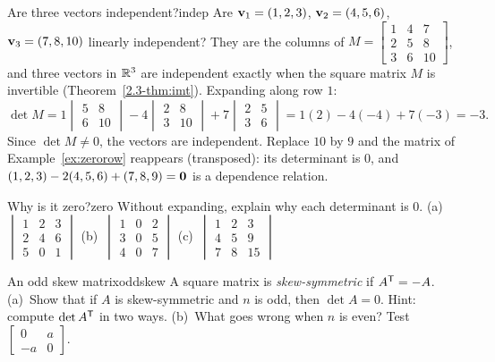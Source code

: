 \documentclass[11pt]{article}
\begin{document}
\begin{exmp}{Are three vectors independent?}{indep}
Are $\mathbf{v}_1=(1,2,3)$, $\mathbf{v}_2=(4,5,6)$, $\mathbf{v}_3=(7,8,10)$ linearly independent? They are the columns of $M=\begin{bmatrix}1&4&7\\2&5&8\\3&6&10\end{bmatrix}$, and three vectors in $\mathbb{R}^3$ are independent exactly when the square matrix $M$ is invertible (Theorem~\ref{2.3-thm:imt}). Expanding along row $1$:
\[
\det M=1\begin{vmatrix}5&8\\6&10\end{vmatrix}-4\begin{vmatrix}2&8\\3&10\end{vmatrix}+7\begin{vmatrix}2&5\\3&6\end{vmatrix}=1(2)-4(-4)+7(-3)=-3.
\]
Since $\det M\neq0$, the vectors are independent. Replace $10$ by $9$ and the matrix of Example~\ref{ex:zerorow} reappears (transposed): its determinant is $0$, and $(1,2,3)-2(4,5,6)+(7,8,9)=\mathbf{0}$ is a dependence relation.
\end{exmp}

\begin{kc}{Why is it zero?}{zero}
Without expanding, explain why each determinant is $0$.
(a)~$\begin{vmatrix}1&2&3\\2&4&6\\5&0&1\end{vmatrix}$ \quad (b)~$\begin{vmatrix}1&0&2\\3&0&5\\4&0&7\end{vmatrix}$ \quad (c)~$\begin{vmatrix}1&2&3\\4&5&9\\7&8&15\end{vmatrix}$
\end{kc}

\begin{think}{An odd skew matrix}{oddskew}
A square matrix is \emph{skew-symmetric} if $A^{\mathsf T}=-A$. (a)~Show that if $A$ is skew-symmetric and $n$ is odd, then $\det A=0$. Hint: compute $\det A^{\mathsf T}$ in two ways. (b)~What goes wrong when $n$ is even? Test $\begin{bmatrix}0&a\\-a&0\end{bmatrix}$.
\end{think}
\end{document}
